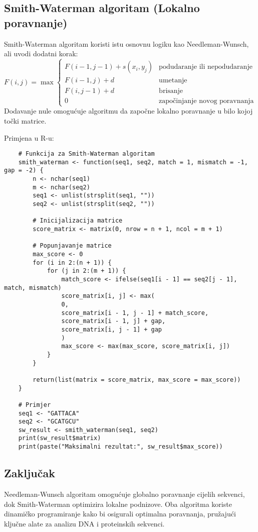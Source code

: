 \documentclass[10pt,a4paper,twoside]{article}
\begin{document}
\subsection*{Smith-Waterman algoritam (Lokalno poravnanje)}

Smith-Waterman algoritam koristi istu osnovnu logiku kao Needleman-Wunsch, ali uvodi dodatni korak:
\[
F(i, j) = \max 
\begin{cases} 
	F(i-1, j-1) + s(x_i, y_j) & \text{podudaranje ili nepodudaranje} \\
	F(i-1, j) + d & \text{umetanje} \\
	F(i, j-1) + d & \text{brisanje} \\
	0 & \text{započinjanje novog poravnanja}
\end{cases}
\]
Dodavanje nule omogućuje algoritmu da započne lokalno poravnanje u bilo kojoj točki matrice.

Primjena u R-u:
\begin{verbatim}
	# Funkcija za Smith-Waterman algoritam
	smith_waterman <- function(seq1, seq2, match = 1, mismatch = -1, gap = -2) {
		n <- nchar(seq1)
		m <- nchar(seq2)
		seq1 <- unlist(strsplit(seq1, ""))
		seq2 <- unlist(strsplit(seq2, ""))
		
		# Inicijalizacija matrice
		score_matrix <- matrix(0, nrow = n + 1, ncol = m + 1)
		
		# Popunjavanje matrice
		max_score <- 0
		for (i in 2:(n + 1)) {
			for (j in 2:(m + 1)) {
				match_score <- ifelse(seq1[i - 1] == seq2[j - 1], match, mismatch)
				score_matrix[i, j] <- max(
				0,
				score_matrix[i - 1, j - 1] + match_score,
				score_matrix[i - 1, j] + gap,
				score_matrix[i, j - 1] + gap
				)
				max_score <- max(max_score, score_matrix[i, j])
			}
		}
		
		return(list(matrix = score_matrix, max_score = max_score))
	}
	
	# Primjer
	seq1 <- "GATTACA"
	seq2 <- "GCATGCU"
	sw_result <- smith_waterman(seq1, seq2)
	print(sw_result$matrix)
	print(paste("Maksimalni rezultat:", sw_result$max_score))
\end{verbatim}

\subsection*{Zaključak}

Needleman-Wunsch algoritam omogućuje globalno poravnanje cijelih sekvenci, dok Smith-Waterman optimizira lokalne podnizove. Oba algoritma koriste dinamičko programiranje kako bi osigurali optimalna poravnanja, pružajući ključne alate za analizu DNA i proteinskih sekvenci.
	
\end{document}
